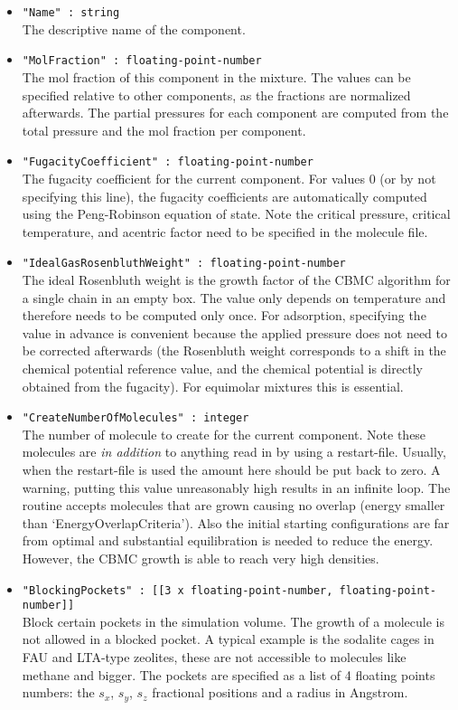 \begin{itemize}
\item{\verb+"Name" : string+}\\
The descriptive name of the component.
\item{\verb+"MolFraction" : floating-point-number+}\\
The mol fraction of this component in the mixture. The values can be specified relative to other components, as the fractions are normalized afterwards.
The partial pressures for each component are computed from the total pressure and the mol fraction per component.
\item{\verb+"FugacityCoefficient" : floating-point-number+}\\
The fugacity coefficient for the current component. For values 0 (or by not specifying this line), the fugacity coefficients are automatically computed using the Peng-Robinson
equation of state. Note the critical pressure, critical temperature, and acentric factor need to be specified in the molecule file.
\item{\verb+"IdealGasRosenbluthWeight" : floating-point-number+}\\
The ideal Rosenbluth weight is the growth factor of the CBMC algorithm for a single chain in an empty box. The value only depends on temperature and therefore needs to be computed
only once. For adsorption, specifying the value in advance is convenient because the applied pressure does not need to be corrected afterwards (the Rosenbluth weight corresponds to a shift
in the chemical potential reference value, and the chemical potential is directly obtained from the fugacity). For equimolar mixtures this is essential.
\item{\verb+"CreateNumberOfMolecules" : integer+}\\
The number of molecule to create for the current component. 
Note these molecules are \emph{in addition} to anything read in by using a restart-file. Usually, when the restart-file
is used the amount here should be put back to zero. A warning, putting this value unreasonably high results in an infinite loop. 
The routine accepts molecules that are grown causing no overlap (energy smaller than `EnergyOverlapCriteria'). 
Also the initial starting configurations are far from optimal and substantial equilibration is needed to reduce the energy.
However, the CBMC growth is able to reach very high densities.
\item{\verb+"BlockingPockets" : [[3 x floating-point-number, floating-point-number]]+}\\
Block certain pockets in the simulation volume. The growth of a molecule is not allowed in a blocked pocket. 
A typical example is the sodalite cages in FAU and LTA-type zeolites,
these are not accessible to molecules like methane and bigger.
The pockets are specified as a list of 4 floating points numbers: the $s_x$, $s_y$, $s_z$ fractional positions and 
a radius in Angstrom.


\end{itemize}
